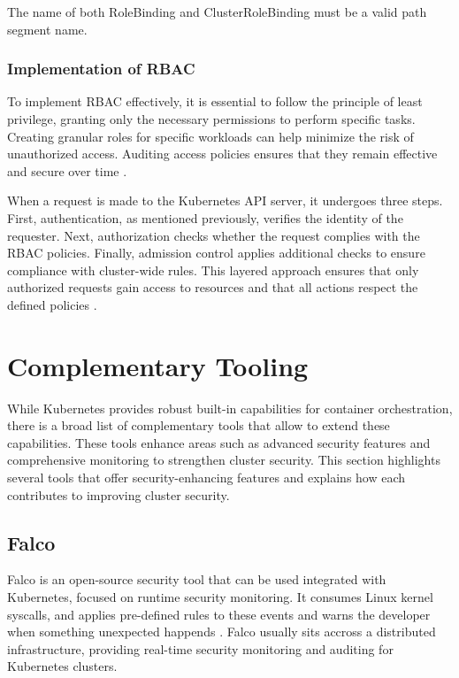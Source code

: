 \documentclass[a4paper,11pt,openright,BCOR=15mm]{scrbook}
\begin{document}
The name of both RoleBinding and ClusterRoleBinding must be a valid path segment name.
	

\subsection{Implementation of RBAC}

To implement RBAC effectively, it is essential to follow the principle of least privilege, granting only the necessary permissions to perform specific tasks. Creating granular roles for specific workloads can help minimize the risk of unauthorized access. Auditing access policies ensures that they remain effective and secure over time \cite{rostami_role-based_2023}.

When a request is made to the Kubernetes API server, it undergoes three steps. First, authentication, as mentioned previously, verifies the identity of the requester. Next, authorization checks whether the request complies with the RBAC policies. Finally, admission control applies additional checks to ensure compliance with cluster-wide rules. This layered approach ensures that only authorized requests gain access to resources and that all actions respect the defined policies \cite{the_linux_foundation_rbacauthorization_2024}.




		
\chapter{Complementary Tooling}

While Kubernetes provides robust built-in capabilities for container orchestration, there is a broad list of complementary tools that allow to extend these capabilities.  These tools enhance areas such as advanced security features and comprehensive monitoring to strengthen cluster security. This section highlights several tools that offer security-enhancing features and explains how each contributes to improving cluster security.

\section{Falco}\label{sect:complementNetSec}

Falco is an open-source security tool that can be used integrated with Kubernetes, focused on runtime security monitoring. It consumes Linux kernel syscalls, and applies pre-defined rules to these events and warns the developer when something unexpected happends \cite{falco_about_page}. Falco usually sits accross a distributed infrastructure, providing real-time security monitoring and auditing for Kubernetes clusters.
\end{document}
